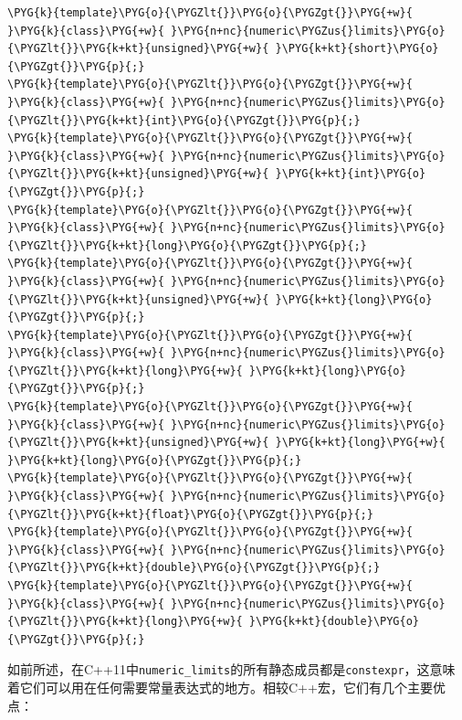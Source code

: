 \begin{codeblockbg}
\begin{Verbatim}[commandchars=\\\{\},breaklines=true,breakanywhere=true,fontsize=\codefont,xleftmargin=17bp]
\PYG{k}{template}\PYG{o}{\PYGZlt{}}\PYG{o}{\PYGZgt{}}\PYG{+w}{ }\PYG{k}{class}\PYG{+w}{ }\PYG{n+nc}{numeric\PYGZus{}limits}\PYG{o}{\PYGZlt{}}\PYG{k+kt}{unsigned}\PYG{+w}{ }\PYG{k+kt}{short}\PYG{o}{\PYGZgt{}}\PYG{p}{;}
\PYG{k}{template}\PYG{o}{\PYGZlt{}}\PYG{o}{\PYGZgt{}}\PYG{+w}{ }\PYG{k}{class}\PYG{+w}{ }\PYG{n+nc}{numeric\PYGZus{}limits}\PYG{o}{\PYGZlt{}}\PYG{k+kt}{int}\PYG{o}{\PYGZgt{}}\PYG{p}{;}
\PYG{k}{template}\PYG{o}{\PYGZlt{}}\PYG{o}{\PYGZgt{}}\PYG{+w}{ }\PYG{k}{class}\PYG{+w}{ }\PYG{n+nc}{numeric\PYGZus{}limits}\PYG{o}{\PYGZlt{}}\PYG{k+kt}{unsigned}\PYG{+w}{ }\PYG{k+kt}{int}\PYG{o}{\PYGZgt{}}\PYG{p}{;}
\PYG{k}{template}\PYG{o}{\PYGZlt{}}\PYG{o}{\PYGZgt{}}\PYG{+w}{ }\PYG{k}{class}\PYG{+w}{ }\PYG{n+nc}{numeric\PYGZus{}limits}\PYG{o}{\PYGZlt{}}\PYG{k+kt}{long}\PYG{o}{\PYGZgt{}}\PYG{p}{;}
\PYG{k}{template}\PYG{o}{\PYGZlt{}}\PYG{o}{\PYGZgt{}}\PYG{+w}{ }\PYG{k}{class}\PYG{+w}{ }\PYG{n+nc}{numeric\PYGZus{}limits}\PYG{o}{\PYGZlt{}}\PYG{k+kt}{unsigned}\PYG{+w}{ }\PYG{k+kt}{long}\PYG{o}{\PYGZgt{}}\PYG{p}{;}
\PYG{k}{template}\PYG{o}{\PYGZlt{}}\PYG{o}{\PYGZgt{}}\PYG{+w}{ }\PYG{k}{class}\PYG{+w}{ }\PYG{n+nc}{numeric\PYGZus{}limits}\PYG{o}{\PYGZlt{}}\PYG{k+kt}{long}\PYG{+w}{ }\PYG{k+kt}{long}\PYG{o}{\PYGZgt{}}\PYG{p}{;}
\PYG{k}{template}\PYG{o}{\PYGZlt{}}\PYG{o}{\PYGZgt{}}\PYG{+w}{ }\PYG{k}{class}\PYG{+w}{ }\PYG{n+nc}{numeric\PYGZus{}limits}\PYG{o}{\PYGZlt{}}\PYG{k+kt}{unsigned}\PYG{+w}{ }\PYG{k+kt}{long}\PYG{+w}{ }\PYG{k+kt}{long}\PYG{o}{\PYGZgt{}}\PYG{p}{;}
\PYG{k}{template}\PYG{o}{\PYGZlt{}}\PYG{o}{\PYGZgt{}}\PYG{+w}{ }\PYG{k}{class}\PYG{+w}{ }\PYG{n+nc}{numeric\PYGZus{}limits}\PYG{o}{\PYGZlt{}}\PYG{k+kt}{float}\PYG{o}{\PYGZgt{}}\PYG{p}{;}
\PYG{k}{template}\PYG{o}{\PYGZlt{}}\PYG{o}{\PYGZgt{}}\PYG{+w}{ }\PYG{k}{class}\PYG{+w}{ }\PYG{n+nc}{numeric\PYGZus{}limits}\PYG{o}{\PYGZlt{}}\PYG{k+kt}{double}\PYG{o}{\PYGZgt{}}\PYG{p}{;}
\PYG{k}{template}\PYG{o}{\PYGZlt{}}\PYG{o}{\PYGZgt{}}\PYG{+w}{ }\PYG{k}{class}\PYG{+w}{ }\PYG{n+nc}{numeric\PYGZus{}limits}\PYG{o}{\PYGZlt{}}\PYG{k+kt}{long}\PYG{+w}{ }\PYG{k+kt}{double}\PYG{o}{\PYGZgt{}}\PYG{p}{;}
\end{Verbatim}
\end{codeblockbg}



如前所述，在C++11中\texttt{numeric\_\allowbreak{}limits}的所有静态成员都是\texttt{constexpr}，这意味着它们可以用在任何需要常量表达式的地方。相较C++宏，它们有几个主要优点：



